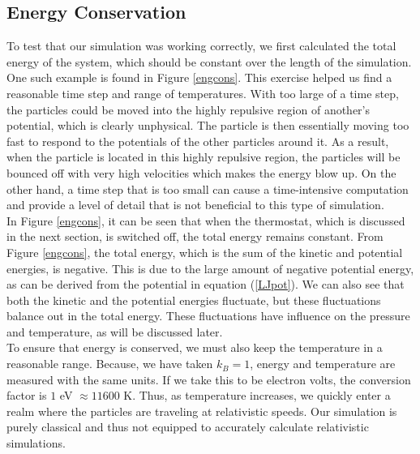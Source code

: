 \documentclass{article}
\begin{document}
\begin{multicols}{2}
\subsection{Energy Conservation}

To test that our simulation was working correctly, we first calculated the total energy of the system, which should be constant over the length of the simulation.  One such example is found in Figure \ref{engcons}.  This exercise helped us find a reasonable time step and range of temperatures.  With too large of a time step, the particles could be moved into the highly repulsive region of another's potential, which is clearly unphysical. The particle is then essentially moving too fast to respond to the potentials of the other particles around it. As a result, when the particle is located in this highly repulsive region, the particles will be bounced off with very high velocities which makes the energy blow up. On the other hand, a time step that is too small can cause a time-intensive computation and provide a level of detail that is not beneficial to this type of simulation. \\

In Figure \ref{engcons}, it can be seen that when the thermostat, which is discussed in the next section, is switched off, the total energy remains constant.  From Figure \ref{engcons}, the total energy, which is the sum of the kinetic and potential energies, is negative.  This is due to the large amount of negative potential energy, as can be derived from the potential in equation (\ref{LJpot}).   We can also see that both the kinetic and the potential energies fluctuate, but these fluctuations balance out in the total energy. These fluctuations have influence on the pressure and temperature, as will be discussed later.\\

To ensure that energy is conserved, we must also keep the temperature in a reasonable range.  Because, we have taken $k_B =1$, energy and temperature are measured with the same units.  If we take this to be electron volts, the conversion factor is $1 $ eV $\approx 11600$ K.  Thus, as temperature increases, we quickly enter a realm where the particles are traveling at relativistic speeds.  Our simulation is purely classical and thus not equipped to accurately calculate relativistic simulations.


\end{multicols}
\end{document}
